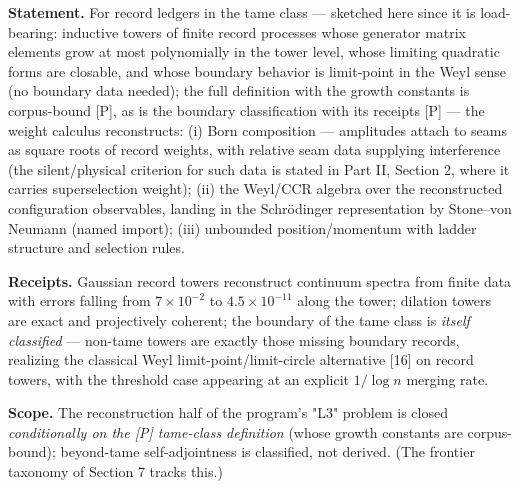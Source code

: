 \documentclass[11pt]{article}
\begin{document}
\textbf{Statement.}  For record ledgers in the tame class — sketched here since it is load-bearing: inductive towers of finite record processes whose generator matrix elements grow at most polynomially in the tower level, whose limiting quadratic forms are closable, and whose boundary behavior is limit-point in the Weyl sense (no boundary data needed); the full definition with the growth constants is corpus-bound [P], as is the boundary classification with its receipts [P] — the weight calculus reconstructs: (i) Born composition — amplitudes attach to seams as square roots of record weights, with relative seam data supplying interference (the silent/physical criterion for such data is stated in Part II, Section 2, where it carries superselection weight); (ii) the Weyl/CCR algebra over the reconstructed configuration observables, landing in the Schrödinger representation by Stone–von Neumann (named import); (iii) unbounded position/momentum with ladder structure and selection rules.

\textbf{Receipts.}  Gaussian record towers reconstruct continuum spectra from finite data with errors falling from $7\times 10^{-2}$ to $4.5\times 10^{-11}$ along the tower; dilation towers are exact and projectively coherent; the boundary of the tame class is \emph{itself classified} — non-tame towers are exactly those missing boundary records, realizing the classical Weyl limit-point/limit-circle alternative [16] on record towers, with the threshold case appearing at an explicit $1/\log n$ merging rate.

\textbf{Scope.}  The reconstruction half of the program's "L3" problem is closed \emph{conditionally on the [P] tame-class definition} (whose growth constants are corpus-bound); beyond-tame self-adjointness is classified, not derived.  (The frontier taxonomy of Section 7 tracks this.)
\end{document}

